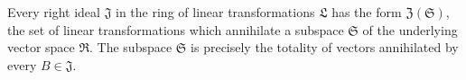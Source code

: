 Every right ideal $\mathfrak{J}$ in the ring of linear transformations $\mathfrak{L}$ has the form $\mathfrak{Z}(\mathfrak{S})$, the set of linear transformations which annihilate a subspace $\mathfrak{S}$ of the underlying vector space $\mathfrak{R}$. The subspace $\mathfrak{S}$ is precisely the totality of vectors annihilated by every $B \in \mathfrak{J}$.
